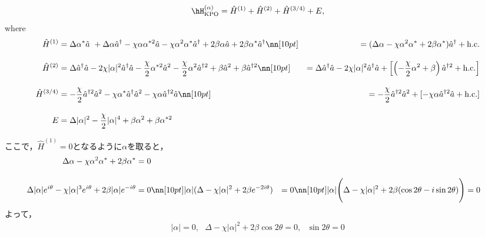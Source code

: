 \begin{equation}
    \hH_{\rm{KPO}}^{(\alpha)}=\hat{H}^{(1)} + \hat{H}^{(2)} + \hat{H}^{(3/4)} + E,
\end{equation}
where
\begin{align}
    \hat{H}^{(1)}&=
    \Delta\alpha^{\ast}\hat{a}\ + \Delta\alpha\hat{a}^{\dagger}
    - \chi\alpha\alpha^{\ast2}\hat{a}
    - \chi\alpha^2\alpha^{\ast}\hat{a}^{\dagger}
    +2\beta\alpha\hat{a}
    + 2\beta\alpha^{\ast}\hat{a}^{\dagger}\nn[10pt]
    &=
    (\Delta\alpha
    - \chi\alpha^2\alpha^{\ast}
    + 2\beta\alpha^{\ast})\hat{a}^{\dagger}
    +{\rm{h.c.}}
    \\[10pt]
    \hat{H}^{(2)}
    &=\Delta\hat{a}^{\dagger}\hat{a} 
    - 2\chi|\alpha|^2\hat{a}^{\dagger}\hat{a}- \frac{\chi}{2}\alpha^{\ast2}\hat{a}^2
    - \frac{\chi}{2}\alpha^2\hat{a}^{\dagger2}
    +\beta\hat{a}^2+\beta\hat{a}^{\dagger2}
    \nn[10pt]
    &=\Delta\hat{a}^{\dagger}\hat{a} 
    - 2\chi|\alpha|^2\hat{a}^{\dagger}\hat{a}
    +\left[\left(- \frac{\chi}{2}\alpha^2
    +\beta\right)\hat{a}^{\dagger2}
    +{\rm{h.c.}}\right]
    \\[10pt]
    \hat{H}^{(3/4)}&=
    - \frac{\chi}{2}\hat{a}^{\dagger2}\hat{a}^2 
    - \chi\alpha^{\ast}\hat{a}^{\dagger}\hat{a}^2
    - \chi\alpha\hat{a}^{\dagger2}\hat{a} 
    \nn[10pt]
    &=
    - \frac{\chi}{2}\hat{a}^{\dagger2}\hat{a}^2 
    +[- \chi\alpha\hat{a}^{\dagger2}\hat{a} +{\rm{h.c.}}]
    \\[10pt]
    E&=\Delta|\alpha|^2- \frac{\chi}{2}|\alpha|^4+\beta\alpha^2 
    +\beta\alpha^{\ast2}
\end{align}

ここで，$\hat{H}^{(1)}=0$となるように$\alpha$を取ると，
\begin{align}
    \Delta\alpha - \chi\alpha^2\alpha^{\ast} + 2\beta\alpha^{\ast} &= 0\\[10pt]
    \Delta|\alpha|e^{i\theta} - \chi|\alpha|^3e^{i\theta} + 2\beta|\alpha|e^{-i\theta} &= 0
    \nn[10pt]
    |\alpha|(\Delta  - \chi|\alpha|^2 + 2\beta e^{-2i\theta}) &= 0
    \nn[10pt]
    |\alpha|\Biggl(\Delta  - \chi|\alpha|^2 + 2\beta(\cos{2\theta}-i\sin{2\theta})\Biggr) &= 0
\end{align}
よって，
\begin{align}
    |\alpha|=0,\ \ \  \Delta- \chi|\alpha|^2
    +2\beta\cos{2\theta}=0,\ \ \ \sin{2\theta}= 0
\end{align}

